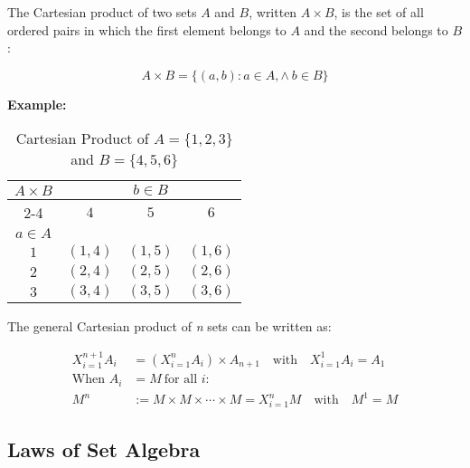 The Cartesian product of two sets \(A\) and \(B\), written \(A \times B\), is the set of all ordered pairs 
in which the first element belongs to \(A\) and the second belongs to \(B\):

\[
	A \times B = \{ (a, b) : a \in A, \land\ b \in B\}
\]

\textbf{Example:}
\vspace{\baselineskip}

\begin{table}[H]
	\centering
	\caption{Cartesian Product of \(A = \{1, 2, 3\}\) and \(B = \{4, 5, 6\}\)}
	\begin{tabular}{|c|c|c|c|}
		\hline
		\multirow{3}{*}{\(A \times B\)} & \multicolumn{3}{c|}{\(b \in B\)}                       \\
		\cline{2-4}
		                              & \(4\)                            & \(5\)      & \(6\)      \\
		\hline
		\(a \in A\)                     &                                &          &          \\
		\hline
		\(1\)                           & \((1, 4)\)                       & \((1, 5)\) & \((1, 6)\) \\
		\hline
		\(2\)                           & \((2, 4)\)                       & \((2, 5)\) & \((2, 6)\) \\
		\hline
		\(3\)                           & \((3, 4)\)                       & \((3, 5)\) & \((3, 6)\) \\
		\hline
	\end{tabular}
	\label{tab:cartesian_product}
\end{table}

The general Cartesian product of \emph{n} sets can be written as:

\begin{align*}
	X_{i = 1}^{n + 1} A_i & = \left( X_{i = 1}^{n} A_i \right) \times A_{n + 1} \quad \text{with} \quad X_{i = 1}^{1} A_i = A_1 \\
	\text{When } A_i      & = M \ \text{for all } i:                                                                            \\
	M^n                   & := M \times M \times \cdots \times M = X_{i = 1}^{n} M \quad \text{with} \quad M^1 = M
\end{align*}

\subsection{Laws of Set Algebra}

